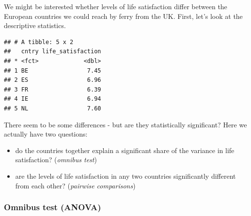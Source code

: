 \documentclass[
]{book}
\newenvironment{Shaded}{\begin{snugshade}}{\end{snugshade}}
\newcommand{\CommentTok}[1]{\textcolor[rgb]{0.56,0.35,0.01}{\textit{#1}}}
\newcommand{\DataTypeTok}[1]{\textcolor[rgb]{0.13,0.29,0.53}{#1}}
\newcommand{\KeywordTok}[1]{\textcolor[rgb]{0.13,0.29,0.53}{\textbf{#1}}}
\newcommand{\NormalTok}[1]{#1}
\newcommand{\OperatorTok}[1]{\textcolor[rgb]{0.81,0.36,0.00}{\textbf{#1}}}
\newcommand{\StringTok}[1]{\textcolor[rgb]{0.31,0.60,0.02}{#1}}
\providecommand{\tightlist}{%
  \setlength{\itemsep}{0pt}\setlength{\parskip}{0pt}}
\begin{document}
We might be interested whether levels of life satisfaction differ between the European countries we could reach by ferry from the UK. First, let's look at the descriptive statistics.

\begin{Shaded}
\end{Shaded}

\begin{verbatim}
## # A tibble: 5 x 2
##   cntry life_satisfaction
## * <fct>             <dbl>
## 1 BE                 7.45
## 2 ES                 6.96
## 3 FR                 6.39
## 4 IE                 6.94
## 5 NL                 7.60
\end{verbatim}

There seem to be some differences - but are they statistically significant? Here we actually have two questions:

\begin{itemize}
\tightlist
\item
  do the countries together explain a significant share of the variance in life satisfaction? (\emph{omnibus test})
\item
  are the levels of life satisfaction in any two countries significantly different from each other? (\emph{pairwise comparisons})
\end{itemize}

\hypertarget{omnibus-test-anova}{%
\subsubsection{Omnibus test (ANOVA)}\label{omnibus-test-anova}}

\begin{Shaded}
\end{Shaded}
\end{document}
